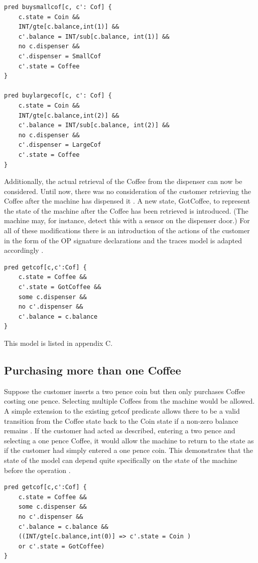\documentclass[a4paper,10pt]{report}
\begin{document}
\begin{verbatim}
pred buysmallcof[c, c': Cof] {
	c.state = Coin &&
	INT/gte[c.balance,int(1)] &&
	c'.balance = INT/sub[c.balance, int(1)] &&
	no c.dispenser &&
	c'.dispenser = SmallCof
	c'.state = Coffee
}

pred buylargecof[c, c': Cof] {
	c.state = Coin &&
	INT/gte[c.balance,int(2)] &&
	c'.balance = INT/sub[c.balance, int(2)] &&
	no c.dispenser &&
	c'.dispenser = LargeCof
	c'.state = Coffee
}
\end{verbatim}

 Additionally, the actual retrieval of the Coffee from the dispenser can now be considered. Until now, there was no consideration of the customer retrieving the Coffee after the machine has dispensed it \cite{Boyatt}. A new state, GotCoffee, to represent the state of the machine after the Coffee has been retrieved is introduced. (The machine may, for instance, detect this with a sensor on the dispenser door.) For all of these modifications there is an introduction of the actions of the customer in the form of the OP signature declarations and the traces model is adapted accordingly \cite{Boyatt}.
 
\begin{verbatim}
pred getcof[c,c':Cof] {
	c.state = Coffee &&
	c'.state = GotCoffee &&
	some c.dispenser &&
	no c'.dispenser &&
	c'.balance = c.balance
}
\end{verbatim}

 This model is listed in appendix C.
 
\subsection{Purchasing more than one Coffee}
\label{Purchasing more than one coffee}

Suppose the customer inserts a two pence coin but then only purchases Coffee costing one pence. Selecting multiple Coffees from the machine would be allowed. A simple extension to the existing getcof predicate allows there to be a valid transition from the Coffee state back to the Coin state if a non-zero balance remains \cite{Boyatt}. If the customer had acted as described, entering a two pence and selecting a one pence Coffee, it would allow the machine to return to the state as if the customer had simply entered a one pence coin. This demonstrates that the state of the model can depend quite specifically on the state of the machine before the operation \cite{Boyatt}.

\begin{verbatim}
pred getcof[c,c':Cof] {
	c.state = Coffee &&
	some c.dispenser &&
	no c'.dispenser &&
	c'.balance = c.balance &&
	((INT/gte[c.balance,int(0)] => c'.state = Coin )
	or c'.state = GotCoffee)
}
\end{verbatim}
\end{document}
